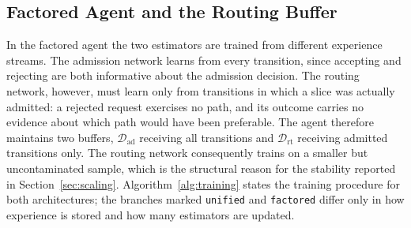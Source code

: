 \documentclass[10pt,journal,comsoc]{IEEEtran}
\begin{document}
\subsection{Factored Agent and the Routing Buffer}
In the factored agent the two estimators are trained from different
experience streams. The admission network learns from every transition,
since accepting and rejecting are both informative about the admission
decision. The routing network, however, must learn only from transitions
in which a slice was actually admitted: a rejected request exercises no
path, and its outcome carries no evidence about which path would have
been preferable. The agent therefore maintains two buffers,
$\mathcal{D}_{\text{ad}}$ receiving all transitions and
$\mathcal{D}_{\text{rt}}$ receiving admitted transitions only. The
routing network consequently trains on a smaller but uncontaminated
sample, which is the structural reason for the stability reported in
Section~\ref{sec:scaling}. Algorithm~\ref{alg:training} states the
training procedure for both architectures; the branches marked
\texttt{unified} and \texttt{factored} differ only in how experience is
stored and how many estimators are updated.
\end{document}

